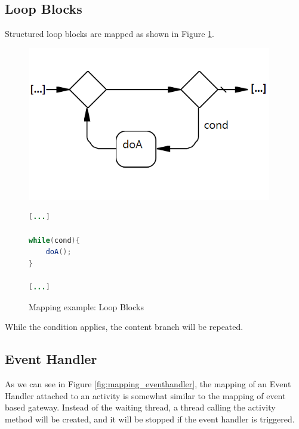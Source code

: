\subsection{Loop Blocks}
Structured loop blocks are mapped as shown in Figure \ref{fig:mapping_loop}.
\begin{figure}[h]
\begin{minipage}[c]{0.5\textwidth}
	\includegraphics[width=0.95\textwidth]{images/mapping/loop_block.png}
\end{minipage}
\begin{minipage}[c]{0.5\textwidth}
\begin{lstlisting}[language=Java]
[...]

while(cond){
	doA();
}

[...]
\end{lstlisting}
\end{minipage}
\caption{Mapping example: Loop Blocks }%
\label{fig:mapping_loop}%
\end{figure}

While the condition applies, the content branch will be repeated. 

\newpage
\subsection{Event Handler}
\label{sec:handler}
As we can see in Figure \ref{fig:mapping_eventhandler}, the mapping of an Event Handler attached to an activity is somewhat similar to the mapping of event based gateway. Instead of the waiting thread, a thread calling the activity method will be created, and it will be stopped if the event handler is triggered.\\

